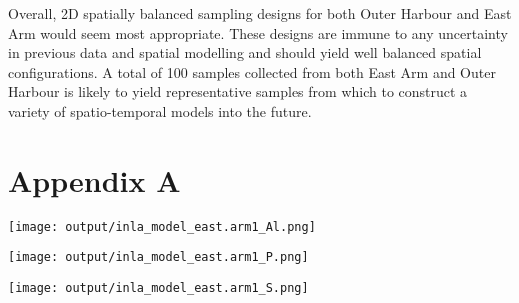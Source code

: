 \documentclass[a4paper]{article}
\let\origfigure=\figure
\let\endorigfigure=\endfigure
\renewenvironment{figure}[1][]{%
   \origfigure[H]
}{%
   \endorigfigure
}
\begin{document}
Overall, 2D spatially balanced sampling designs for both Outer Harbour
and East Arm would seem most appropriate. These designs are immune to
any uncertainty in previous data and spatial modelling and should yield
well balanced spatial configurations. A total of 100 samples collected
from both East Arm and Outer Harbour is likely to yield representative
samples from which to construct a variety of spatio-temporal models into
the future.

\hypertarget{appendix-a}{%
\section{Appendix A}\label{appendix-a}}

\begin{figure}
\centering\scriptsize\scriptsize
\texttt{[image: output/inla\_model\_east.arm1\_Al.png]}
\caption{Integrated Nested Laplace Approximation (INLA) barrier spatial
modelling of Aluminium. The diagram illustrates a) the mesh, b) the
barrier mask, c) the resulting predicted 2D surface (and observed
training data as points) and d) the resulting predicted 2D surface
scaled to the range of predictions.\label{fig:inla_model_east.arm_Al}}
\end{figure}

\begin{figure}
\centering\scriptsize\scriptsize
\texttt{[image: output/inla\_model\_east.arm1\_P.png]}
\caption{Integrated Nested Laplace Approximation (INLA) barrier spatial
modelling of Phosphorus. The diagram illustrates a) the mesh, b) the
barrier mask, c) the resulting predicted 2D surface (and observed
training data as points) and d) the resulting predicted 2D surface
scaled to the range of predictions.\label{fig:inla_model_east.arm_P}}
\end{figure}

\begin{figure}
\centering\scriptsize\scriptsize
\texttt{[image: output/inla\_model\_east.arm1\_S.png]}
\caption{Integrated Nested Laplace Approximation (INLA) barrier spatial
modelling of Sulfur. The diagram illustrates a) the mesh, b) the barrier
mask, c) the resulting predicted 2D surface (and observed training data
as points) and d) the resulting predicted 2D surface scaled to the range
of predictions.\label{fig:inla_model_east.arm_S}}
\end{figure}
\end{document}
